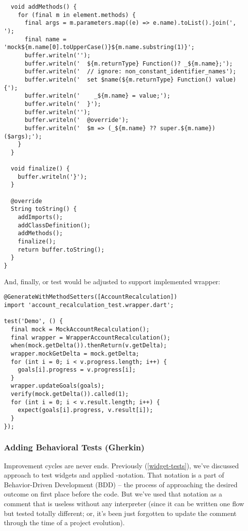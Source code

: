 \begin{lstlisting}
  void addMethods() {
    for (final m in element.methods) {
      final args = m.parameters.map((e) => e.name).toList().join(', ');
      final name = 'mock${m.name[0].toUpperCase()}${m.name.substring(1)}';
      buffer.writeln('');
      buffer.writeln('  ${m.returnType} Function()? _${m.name};');
      buffer.writeln('  // ignore: non_constant_identifier_names');
      buffer.writeln('  set $name(${m.returnType} Function() value) {');
      buffer.writeln('    _${m.name} = value;');
      buffer.writeln('  }');
      buffer.writeln('');
      buffer.writeln('  @override');
      buffer.writeln('  $m => (_${m.name} ?? super.${m.name})($args);');
    }
  }

  void finalize() {
    buffer.writeln('}');
  }

  @override
  String toString() {
    addImports();
    addClassDefinition();
    addMethods();
    finalize();
    return buffer.toString();
  }
}
\end{lstlisting}

\noindent And, finally, or test would be adjusted to support implemented wrapper:

\begin{lstlisting}
@GenerateWithMethodSetters([AccountRecalculation])
import 'account_recalculation_test.wrapper.dart';

test('Demo', () {
  final mock = MockAccountRecalculation();
  final wrapper = WrapperAccountRecalculation();
  when(mock.getDelta()).thenReturn(v.getDelta);
  wrapper.mockGetDelta = mock.getDelta;
  for (int i = 0; i < v.progress.length; i++) {
    goals[i].progress = v.progress[i];
  }
  wrapper.updateGoals(goals);
  verify(mock.getDelta()).called(1);
  for (int i = 0; i < v.result.length; i++) {
    expect(goals[i].progress, v.result[i]);
  }
});
\end{lstlisting}


\subsubsection{Adding Behavioral Tests (Gherkin)}

Improvement cycles are never ends. Previously (\ref{widget-tests}), we've discussed approach to test widgets and applied 
-notation. That notation is a part of Behavior-Driven Development (BDD) -- the process
of approaching the desired outcome on first place before the code. But we've used that notation as a comment that is 
useless without any interpreter (since it can be written one flow but tested totally different; or, it's been just
forgotten to update the comment through the time of a project evolution).

